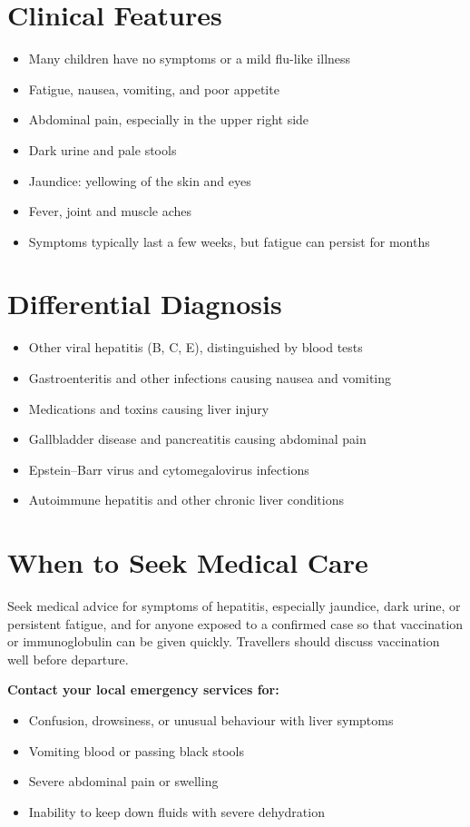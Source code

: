 \section*{Clinical Features}
\begin{itemize}
    \item Many children have no symptoms or a mild flu-like illness
    \item Fatigue, nausea, vomiting, and poor appetite
    \item Abdominal pain, especially in the upper right side
    \item Dark urine and pale stools
    \item Jaundice: yellowing of the skin and eyes
    \item Fever, joint and muscle aches
    \item Symptoms typically last a few weeks, but fatigue can persist for months
\end{itemize}

\section*{Differential Diagnosis}
\begin{itemize}
    \item Other viral hepatitis (B, C, E), distinguished by blood tests
    \item Gastroenteritis and other infections causing nausea and vomiting
    \item Medications and toxins causing liver injury
    \item Gallbladder disease and pancreatitis causing abdominal pain
    \item Epstein--Barr virus and cytomegalovirus infections
    \item Autoimmune hepatitis and other chronic liver conditions
\end{itemize}

\section*{When to Seek Medical Care}
Seek medical advice for symptoms of hepatitis, especially jaundice, dark urine, or persistent fatigue, and for anyone exposed to a confirmed case so that vaccination or immunoglobulin can be given quickly. Travellers should discuss vaccination well before departure.

\textbf{Contact your local emergency services for:}
\begin{itemize}
    \item Confusion, drowsiness, or unusual behaviour with liver symptoms
    \item Vomiting blood or passing black stools
    \item Severe abdominal pain or swelling
    \item Inability to keep down fluids with severe dehydration
\end{itemize}

